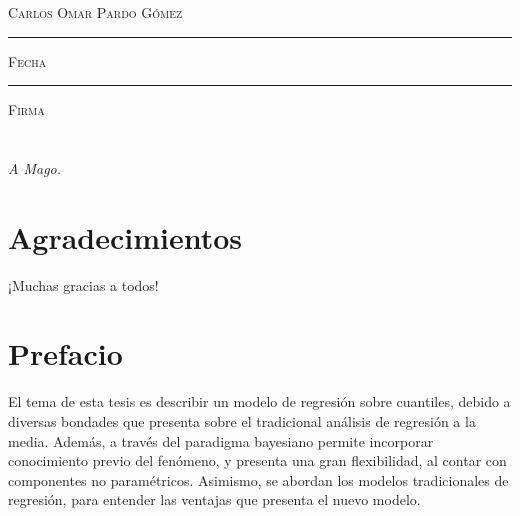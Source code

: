 \documentclass[letterpaper,onside,11pt,review,usenames,dvipsnames]{report}
\begin{document}
\centering

\hspace{3em}

\textsc{Carlos Omar Pardo G\'omez}

\vspace{4em}

\rule[1em]{20em}{0.5pt} %

\textsc{Fecha}
 
\vspace{6em}

\rule[1em]{20em}{0.5pt} %

\textsc{Firma}

\endgroup
\vspace*{\fill}

\pagestyle{empty}
\frontmatter

\chapter*{}
\begin{flushright}
\textit{A Mago.}
\end{flushright}


\chapter*{Agradecimientos}
¡Muchas gracias a todos!


\pagestyle{plain}
\chapter*{Prefacio}


El tema de esta tesis es describir un modelo de regresi\'on sobre cuantiles, debido a diversas bondades que presenta sobre el tradicional an\'alisis de regresi\'on a la media. Adem\'as, a través del paradigma bayesiano permite incorporar conocimiento previo del fen\'omeno, y presenta una gran flexibilidad, al contar con componentes no param\'etricos. Asimismo, se abordan los modelos tradicionales de regresi\'on, para entender las ventajas que presenta el nuevo modelo.
\end{document}
